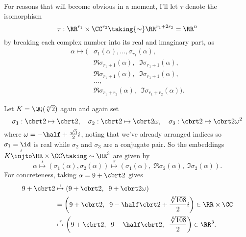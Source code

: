 For reasons that will become obvious in a moment, I'll let $\tau$ denote the isomorphism
\[
	\tau : \RR^{r_1} \times \CC^{r_2} \taking{\sim} \RR^{r_1+2r_2} = \RR^n
\]
by breaking each complex number into its real and imaginary part, as
\begin{align*}
\alpha \mapsto  \big(& \sigma_1(\alpha), \dots, \sigma_{r_1}(\alpha), \\
& \Re \sigma_{r_1+1}(\alpha), \;\; \Im \sigma_{r_1+1}(\alpha), \\
& \Re \sigma_{r_1+1}(\alpha), \;\; \Im \sigma_{r_1+1}(\alpha), \\
& \dots, \\
& \Re \sigma_{r_1+r_2}(\alpha), \;\; \Im \sigma_{r_1+r_2}(\alpha) \big). 
\end{align*}
\begin{example}
	Let $K = \QQ(\sqrt[3]{2})$ again and again set
	\[ \sigma_1 : \cbrt 2 \mapsto \cbrt 2,
		\quad
		\sigma_2 : \cbrt 2 \mapsto \cbrt 2 \omega,
		\quad
		\sigma_3 : \cbrt 2 \mapsto \cbrt 2 \omega^2 \]
	where $\omega = - \half + \frac{\sqrt3}{2} i$,
	noting that we've already arranged indices so $\sigma_1 = \id$ is real
	while $\sigma_2$ and $\sigma_3$ are a conjugate pair.
	So the embeddings $K \overset\iota\injto \RR \times \CC \taking\sim \RR^3$ are given by
	\[
		\alpha \overset\iota\longmapsto \left( \sigma_1(\alpha), \sigma_2(\alpha) \right)
		\overset\tau\longmapsto \left( \sigma_1(\alpha), \; \Re\sigma_2(\alpha), \; \Im\sigma_2(\alpha)  \right). \]
	For concreteness, taking $\alpha = 9 + \cbrt 2$ gives
	\begin{align*}
		9 + \cbrt 2 &\overset\iota\mapsto
		\left( 9 + \cbrt 2, \;\; 9 + \cbrt2\omega \right) \\
		&= \left( 9 + \cbrt 2, \;\;
		9 - \half\cbrt2 + \frac{\sqrt[6]{108}}{2} i  \right) \in \RR \times \CC \\
		&\overset\tau\mapsto \left( 9 + \cbrt 2, \;\; 9 - \half \cbrt 2,
		\;\; \frac{\sqrt[6]{108}}{2}  \right) \in \RR^3.
	\end{align*}
\end{example}

